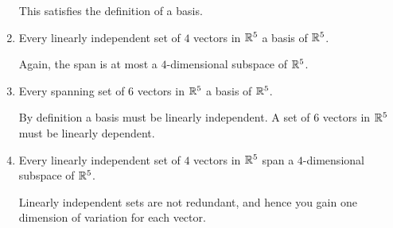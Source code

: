 \documentclass{ximera}
\begin{document}
\begin{exercise}
\begin{enumerate}
    \begin{feedback}
      This satisfies the definition of a basis.
    \end{feedback}
  
    \item Every linearly independent set of $4$ vectors in $\mathbb{R}^5$  a
    basis of $\mathbb{R}^5$.

    \begin{feedback}
      Again, the span is at most a $4$-dimensional subspace of $\mathbb{R}^5$.
    \end{feedback}
  
  
    \item Every spanning set of $6$ vectors in $\mathbb{R}^5$  a basis of
    $\mathbb{R}^5$.

    \begin{feedback}
      By definition a basis must be linearly independent. A set of $6$ vectors in $\mathbb{R}^5$ must be linearly dependent.
    \end{feedback}


    \item Every linearly independent set of $4$ vectors in $\mathbb{R}^5$  span
    a $4$-dimensional subspace of $\mathbb{R}^5$.

    \begin{feedback}
      Linearly independent sets are not redundant, and hence you gain one dimension of variation for each vector.
    \end{feedback}
    \end{enumerate}

  \end{exercise}
\end{document}
